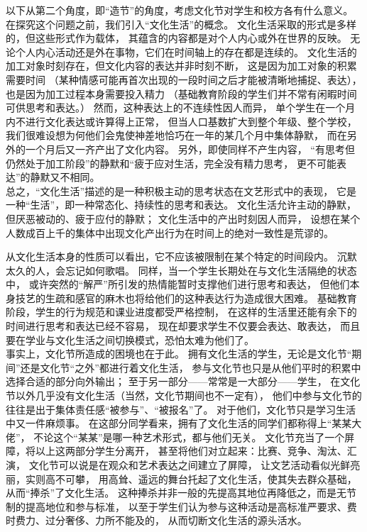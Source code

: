 \documentclass{article}
\begin{document}
    以下从第二个角度，即“造节”的角度，考虑文化节对学生和校方各有什么意义。\\

    在探究这个问题之前，我们引入“文化生活”的概念。
    文化生活采取的形式是多样的，但这些形式作为载体，
    其蕴含的内容都是对个人内心或外在世界的反映。
    无论个人内心活动还是外在事物，它们在时间轴上的存在都是连续的。
    文化生活的加工对象时刻存在，但文化内容的表达并非时刻不断，
    这是因为加工对象的积累需要时间
    （某种情感可能再首次出现的一段时间之后才能被清晰地捕捉、表达），
    也是因为加工过程本身需要投入精力
    （基础教育阶段的学生们并不常有闲暇时间可供思考和表达。）
    然而，这种表达上的不连续性因人而异，
    单个学生在一个月内不进行文化表达或许算得上正常，
    但当人口基数扩大到整个年级、整个学校，
    我们很难设想为何他们会鬼使神差地恰巧在一年的某几个月中集体静默，
    而在另外的一个月后又一齐产出了文化内容。
    另外，即使同样不产生内容，
    “有思考但仍然处于加工阶段”的静默和“疲于应对生活，完全没有精力思考，
    更不可能表达”的静默又不相同。\\

    总之，“文化生活”描述的是一种积极主动的思考状态在文艺形式中的表现，
    它是一种“生活”，即一种常态化、持续性的思考和表达。
    文化生活允许主动的静默，但厌恶被动的、疲于应付的静默；
    文化生活中的产出时刻因人而异，
    设想在某个人数成百上千的集体中出现文化产出行为在时间上的绝对一致性是荒谬的。\\

    \newpage

    从文化生活本身的性质可以看出，它不应该被限制在某个特定的时间段内。
    沉默太久的人，会忘记如何歌唱。
    同样，当一个学生长期处在与文化生活隔绝的状态中，
    或许突然的“解严”所引发的热情能暂时支撑他们进行思考和表达，
    但他们本身技艺的生疏和感官的麻木也将给他们的这种表达行为造成很大困难。
    基础教育阶段，学生的行为规范和课业进度都受严格控制，
    在这样的生活里还能有余下的时间进行思考和表达已经不容易，
    现在却要求学生不仅要会表达、敢表达，
    而且要在学业与文化生活之间切换模式，恐怕太难为他们了。\\

    事实上，文化节所造成的困境也在于此。
    拥有文化生活的学生，无论是文化节“期间”还是文化节“之外”都进行着文化生活，
    参与文化节也只是从他们平时的积累中选择合适的部分向外输出；
    至于另一部分——常常是一大部分——学生，
    在文化节以外几乎没有文化生活（当然，文化节期间也不一定有），
    他们中参与文化节的往往是出于集体责任感“被参与”、“被报名”了。
    对于他们，文化节只是学习生活中又一件麻烦事。
    在这部分同学看来，拥有了文化生活的同学们都称得上“某某大佬”，
    不论这个“某某”是哪一种艺术形式，都与他们无关。
    文化节充当了一个屏障，将以上这两部分学生分离开，
    甚至将他们对立起来：比赛、竞争、淘汰、汇演，
    文化节可以说是在观众和艺术表达之间建立了屏障，
    让文艺活动看似光鲜亮丽，实则高不可攀，
    用高耸、遥远的舞台托起了文化生活，使其失去群众基础，
    从而“捧杀”了文化生活。
    这种捧杀并非一般的先提高其地位再降低之，而是无节制的提高地位和参与标准，
    以至于学生们认为参与这种活动是高标准严要求、费时费力、过分奢侈、力所不能及的，
    从而切断文化生活的源头活水。\\
\end{document}
